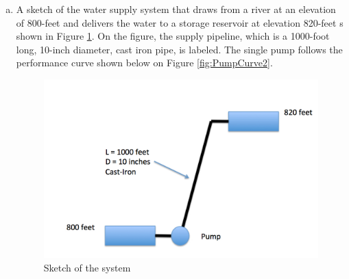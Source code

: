 \documentclass[12pt]{article}
\begin{document}
\begin{enumerate}[a)]
\item A sketch of the water supply system that draws from a river at an elevation of 800-feet and delivers the water to a storage reservoir at elevation 820-feet s shown in Figure \ref{fig:SystemSchematic}.  On the figure, the supply pipeline, which is a 1000-foot long, 10-inch diameter, cast iron pipe, is labeled.  The single pump follows the performance curve shown below on Figure \ref{fig:PumpCurve2}.
\begin{figure}[h!] %
\centering
   \includegraphics[width=5in]{SystemSchematic.jpg}
   \caption{Sketch of the system}
   \label{fig:SystemSchematic} 
\end{figure}


\end{enumerate}
\end{document}
